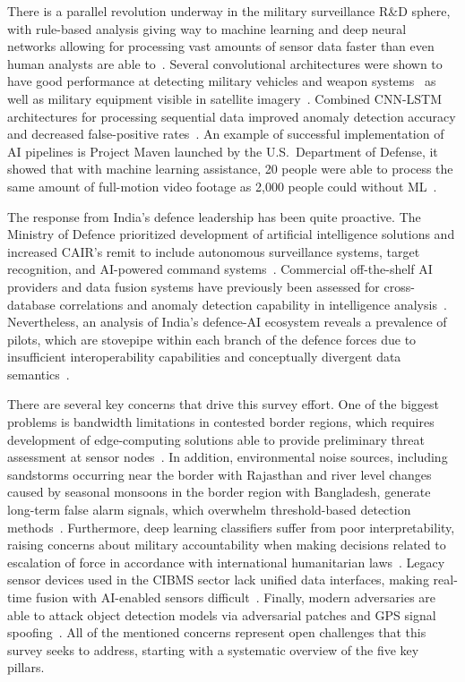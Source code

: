 There is a parallel revolution underway in the military surveillance R\&D sphere, with rule-based analysis giving way to machine learning and deep neural networks allowing for processing vast amounts of sensor data faster than even human analysts are able to~\cite{threatdetect2024rt}. Several convolutional architectures were shown to have good performance at detecting military vehicles and weapon systems~\cite{weapon2023yolov8} as well as military equipment visible in satellite imagery~\cite{satellite2024yolov8}. Combined CNN-LSTM architectures for processing sequential data improved anomaly detection accuracy and decreased false-positive rates~\cite{deepsurvey2023anomaly}. An example of successful implementation of AI pipelines is Project Maven launched by the U.S.\ Department of Defense, it showed that with machine learning assistance, 20 people were able to process the same amount of full-motion video footage as 2{,}000 people could without ML~\cite{cset2024maven, rand2023maven}.

The response from India's defence leadership has been quite proactive. The Ministry of Defence prioritized development of artificial intelligence solutions and increased CAIR's remit to include autonomous surveillance systems, target recognition, and AI-powered command systems~\cite{indiaai2024springer}. Commercial off-the-shelf AI providers and data fusion systems have previously been assessed for cross-database correlations and anomaly detection capability in intelligence analysis~\cite{cset2025ai}. Nevertheless, an analysis of India's defence-AI ecosystem reveals a prevalence of pilots, which are stovepipe within each branch of the defence forces due to insufficient interoperability capabilities and conceptually divergent data semantics~\cite{indiaai2024springer}.

There are several key concerns that drive this survey effort. One of the biggest problems is bandwidth limitations in contested border regions, which requires development of edge-computing solutions able to provide preliminary threat assessment at sensor nodes~\cite{flink2024kafka}. In addition, environmental noise sources, including sandstorms occurring near the border with Rajasthan and river level changes caused by seasonal monsoons in the border region with Bangladesh, generate long-term false alarm signals, which overwhelm threshold-based detection methods~\cite{deepsurvey2023anomaly}. Furthermore, deep learning classifiers suffer from poor interpretability, raising concerns about military accountability when making decisions related to escalation of force in accordance with international humanitarian laws~\cite{military2024xai, meaningful2024hitl}. Legacy sensor devices used in the CIBMS sector lack unified data interfaces, making real-time fusion with AI-enabled sensors difficult~\cite{meng2023multisource}. Finally, modern adversaries are able to attack object detection models via adversarial patches and GPS signal spoofing~\cite{advyolo2022, milai2025risk}. All of the mentioned concerns represent open challenges that this survey seeks to address, starting with a systematic overview of the five key pillars.

